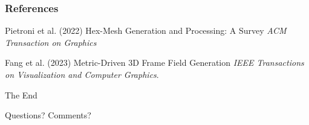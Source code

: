 \documentclass[
	11pt, %
	aspectratio=169, %
]{beamer}
\begin{document}

\begin{frame} %
	\frametitle{References}
	
	\begin{thebibliography}{99} %
		\footnotesize %
		
			Pietroni et al. (2022)
			\newblock Hex-Mesh Generation and Processing: A Survey
			\newblock \emph{ACM Transaction on Graphics}
			
			Fang et al. (2023)
			\newblock Metric-Driven 3D Frame Field Generation
			\newblock \emph{IEEE Transactions on Visualization and Computer Graphics}.
	\end{thebibliography}
\end{frame}


\begin{frame}[plain] %
	\begin{center}
		{\Huge The End}
		
		\bigskip\bigskip %
		
		{\LARGE Questions? Comments?}
	\end{center}
\end{frame}

\end{document}
